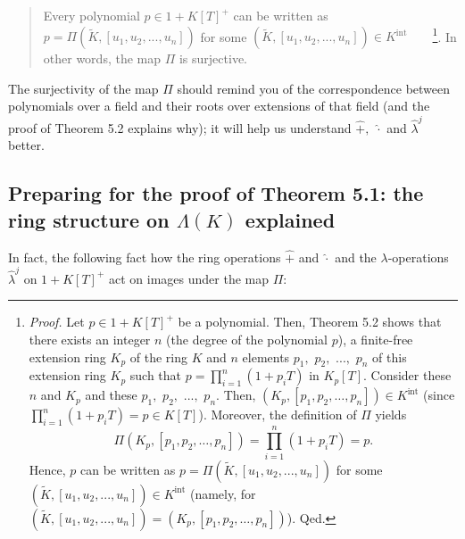\documentclass[numbers=enddot,12pt,final,onecolumn,notitlepage]{scrartcl}%
\begin{document}
\begin{quote}
Every polynomial $p\in1+K\left[  T\right]  ^{+}$ can be written as
$p=\Pi\left(  \widetilde{K},\left[  u_{1},u_{2},...,u_{n}\right]  \right)  $
for some $\left(  \widetilde{K},\left[  u_{1},u_{2},...,u_{n}\right]  \right)
\in K^{\operatorname*{int}}$\ \ \ \ \footnote{\textit{Proof.} Let
$p\in1+K\left[  T\right]  ^{+}$ be a polynomial. Then, Theorem 5.2 shows that
there exists an integer $n$ (the degree of the polynomial $p$), a finite-free
extension ring $K_{p}$ of the ring $K$ and $n$ elements $p_{1},$ $p_{2},$
$...,$ $p_{n}$ of this extension ring $K_{p}$ such that $p=\prod
\limits_{i=1}^{n}\left(  1+p_{i}T\right)  $ in $K_{p}\left[  T\right]  $.
Consider these $n$ and $K_{p}$ and these $p_{1},$ $p_{2},$ $...,$ $p_{n}$.
Then, $\left(  K_{p},\left[  p_{1},p_{2},\ldots,p_{n}\right]  \right)  \in
K^{\operatorname*{int}}$ (since $\prod\limits_{i=1}^{n}\left(  1+p_{i}%
T\right)  =p\in K\left[  T\right]  $). Moreover, the definition of $\Pi$
yields%
\[
\Pi\left(  K_{p},\left[  p_{1},p_{2},\ldots,p_{n}\right]  \right)
=\prod\limits_{i=1}^{n}\left(  1+p_{i}T\right)  =p.
\]
Hence, $p$ can be written as $p=\Pi\left(  \widetilde{K},\left[  u_{1}%
,u_{2},...,u_{n}\right]  \right)  $ for some $\left(  \widetilde{K},\left[
u_{1},u_{2},...,u_{n}\right]  \right)  \in K^{\operatorname*{int}}$ (namely,
for $\left(  \widetilde{K},\left[  u_{1},u_{2},...,u_{n}\right]  \right)
=\left(  K_{p},\left[  p_{1},p_{2},\ldots,p_{n}\right]  \right)  $). Qed.}. In
other words, the map $\Pi$ is surjective.
\end{quote}

The surjectivity of the map $\Pi$ should remind you of the correspondence
between polynomials over a field and their roots over extensions of that field
(and the proof of Theorem 5.2 explains why); it will help us understand
$\widehat{+},$ $\widehat{\cdot}$ and $\widehat{\lambda}^{j}$ better.

\subsection{Preparing for the proof of Theorem 5.1: the ring structure on
$\Lambda\left(  K\right)  $ explained}

In fact, the following fact how the ring operations $\widehat{+}$ and
$\widehat{\cdot}$ and the $\lambda$-operations $\widehat{\lambda}^{j}$ on
$1+K\left[  T\right]  ^{+}$ act on images under the map $\Pi$:
\end{document}
